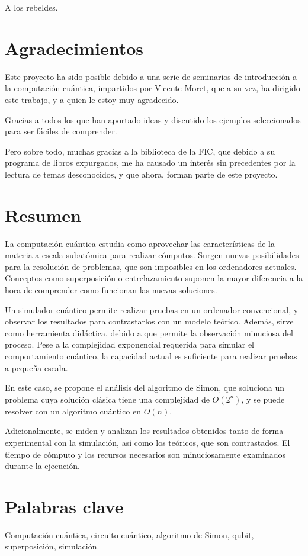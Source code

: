 \begin{dedication}
A los rebeldes.
\end{dedication}

\thispagestyle{empty}
\cleardoublepage
\chapter*{Agradecimientos}

Este proyecto ha sido posible debido a una serie de seminarios de introducción a 
la computación cuántica, impartidos por Vicente Moret, que a su vez, ha dirigido 
este trabajo, y a quien le estoy muy agradecido.

Gracias a todos los que han aportado ideas y discutido los ejemplos 
seleccionados para ser fáciles de comprender.

Pero sobre todo, muchas gracias a la biblioteca de la FIC, que debido a su 
programa de libros expurgados, me ha causado un interés sin precedentes por la 
lectura de temas desconocidos, y que ahora, forman parte de este proyecto.

\clearpage
\thispagestyle{empty}
\cleardoublepage

\chapter*{Resumen}
\noindent
La computación cuántica estudia como aprovechar las características de la 
materia a escala subatómica para realizar cómputos. Surgen nuevas posibilidades 
para la resolución de problemas, que son imposibles en los ordenadores actuales.  
Conceptos como superposición o entrelazamiento suponen la mayor diferencia a la 
hora de comprender como funcionan las nuevas soluciones.

Un simulador cuántico permite realizar pruebas en un ordenador convencional, y 
observar los resultados para contrastarlos con un modelo teórico. Además, sirve 
como herramienta didáctica, debido a que permite la observación minuciosa del 
proceso. Pese a la complejidad exponencial requerida para simular el 
comportamiento cuántico, la capacidad actual es suficiente para realizar pruebas 
a pequeña escala.

En este caso, se propone el análisis del algoritmo de Simon, que soluciona un 
problema cuya solución clásica tiene una complejidad de $O(2^n)$, y se puede 
resolver con un algoritmo cuántico en $O(n)$.

Adicionalmente, se miden y analizan los resultados obtenidos tanto de forma 
experimental con la simulación, así como los teóricos, que son contrastados. El 
tiempo de cómputo y los recursos necesarios son minuciosamente examinados 
durante la ejecución.

\clearpage
\thispagestyle{empty}
\cleardoublepage

\chapter*{Palabras clave}
\noindent
Computación cuántica, circuito cuántico, algoritmo de Simon, qubit,
superposición, simulación.
